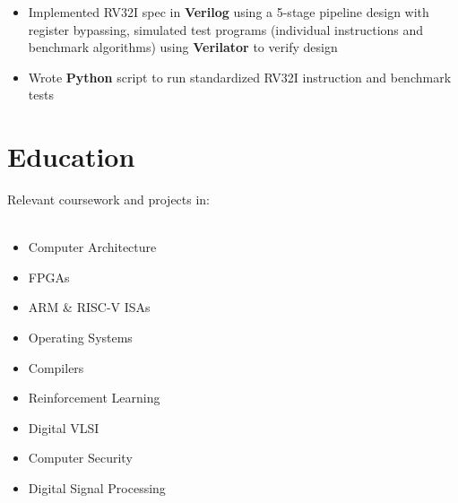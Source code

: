 \documentclass{moderncv}
\begin{document}
{\begin{itemize}
    \item Implemented RV32I spec in \textbf{Verilog} using a 5-stage pipeline design with register bypassing, simulated test programs (individual instructions and benchmark algorithms) using \textbf{Verilator} to verify design
    \item Wrote \textbf{Python} script to run standardized RV32I instruction and benchmark tests
\end{itemize}}


\section{Education}
{
    Relevant coursework and projects in:\\
    \\
\begin{minipage}{0.3\textwidth}
\begin{itemize}
    \item Computer Architecture
    \item FPGAs
    \item ARM \& RISC-V ISAs
\end{itemize}
\end{minipage}
\begin{minipage}{0.3\textwidth}
\begin{itemize}
    \item Operating Systems
    \item Compilers
    \item Reinforcement Learning
\end{itemize}
\end{minipage}
\begin{minipage}{0.3\textwidth}
\begin{itemize}
    \item Digital VLSI
    \item Computer Security
    \item Digital Signal Processing
\end{itemize}
\end{minipage}
}
\end{document}
